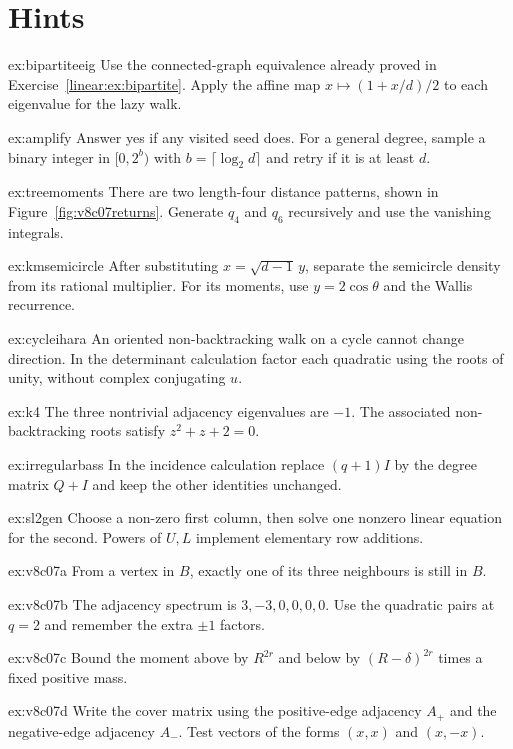 \section{Hints}

\begin{hint}{ex:bipartiteeig}
Use the connected-graph equivalence already proved in Exercise~\ref{linear:ex:bipartite}. Apply the affine map $x\mapsto(1+x/d)/2$ to each eigenvalue for the lazy walk.
\end{hint}
\begin{hint}{ex:amplify}
Answer yes if any visited seed does. For a general degree, sample a binary integer in $[0,2^b)$ with $b=\lceil\log_2d\rceil$ and retry if it is at least $d$.
\end{hint}
\begin{hint}{ex:treemoments}
There are two length-four distance patterns, shown in Figure~\ref{fig:v8c07returns}. Generate $q_4$ and $q_6$ recursively and use the vanishing integrals.
\end{hint}
\begin{hint}{ex:kmsemicircle}
After substituting $x=\sqrt{d-1}\,y$, separate the semicircle density from its rational multiplier. For its moments, use $y=2\cos\theta$ and the Wallis recurrence.
\end{hint}
\begin{hint}{ex:cycleihara}
An oriented non-backtracking walk on a cycle cannot change direction. In the determinant calculation factor each quadratic using the roots of unity, without complex conjugating $u$.
\end{hint}
\begin{hint}{ex:k4}
The three nontrivial adjacency eigenvalues are $-1$. The associated non-backtracking roots satisfy $z^2+z+2=0$.
\end{hint}
\begin{hint}{ex:irregularbass}
In the incidence calculation replace $(q+1)I$ by the degree matrix $Q+I$ and keep the other identities unchanged.
\end{hint}
\begin{hint}{ex:sl2gen}
Choose a non-zero first column, then solve one nonzero linear equation for the second. Powers of $U,L$ implement elementary row additions.
\end{hint}
\begin{hint}{ex:v8c07a}
From a vertex in $B$, exactly one of its three neighbours is still in $B$.
\end{hint}
\begin{hint}{ex:v8c07b}
The adjacency spectrum is $3,-3,0,0,0,0$. Use the quadratic pairs at $q=2$ and remember the extra $\pm1$ factors.
\end{hint}
\begin{hint}{ex:v8c07c}
Bound the moment above by $R^{2r}$ and below by $(R-\delta)^{2r}$ times a fixed positive mass.
\end{hint}
\begin{hint}{ex:v8c07d}
Write the cover matrix using the positive-edge adjacency $A_+$ and the negative-edge adjacency $A_-$. Test vectors of the forms $(x,x)$ and $(x,-x)$.
\end{hint}

